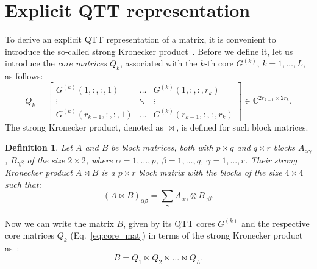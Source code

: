 \documentclass[a4paper]{article}
\newtheorem{definition}{Definition}[section]
\newcommand{\LL}{L}
\begin{document}
	


\section{Explicit QTT representation} \label{sec:qtt_repr}

To derive an explicit QTT representation of a matrix, it is convenient to introduce the so-called strong Kronecker product~\cite{khkaz-lap-2012}.
Before we define it, let us introduce the \emph{core matrices} $Q_k$, associated with the $k$-th core $G^{(k)}$, $k=1,\dots,\LL$, as follows:
\begin{equation}\label{eq:core_mat}
    Q_k = 
    \begin{bmatrix}
        G^{(k)}(1, :, :, 1) & \dots & G^{(k)}(1, :, :, r_k) \\
        \vdots & \ddots & \vdots \\
        G^{(k)}(r_{k-1}, :, :, 1) & \dots & G^{(k)}(r_{k-1}, :, :, r_k)
    \end{bmatrix}
    \in\mathbb{C}^{2r_{k-1} \times 2r_k}.
\end{equation}
The strong Kronecker product, denoted as $\Join$, is defined for such block matrices. 
\begin{definition}
Let $A$ and $B$ be block matrices, both with $p\times q$ and $q\times r$ blocks $A_{\alpha\gamma}$, $B_{\gamma\beta}$ of the size $2\times 2$, where $\alpha=1,\dots,p$, $\beta=1,\dots,q$, $\gamma=1,\dots,r$. Their strong Kronecker product $A\Join B$ is a $p\times r$ block matrix with the blocks of the size $4\times 4$ such that:
\[
    (A\Join B)_{\alpha\beta} = \sum_{\gamma} A_{\alpha\gamma} \otimes B_{\gamma \beta}.
\]
\end{definition}
Now we can write the matrix $B$, given by its QTT cores $G^{(k)}$ and the respective core matrices $Q_k$ (Eq.~\eqref{eq:core_mat}) in terms of the strong Kronecker product as~\cite{khkaz-lap-2012}:
\[
    B = Q_1 \Join Q_2 \Join \dots \Join Q_\LL.
\]
\end{document}
